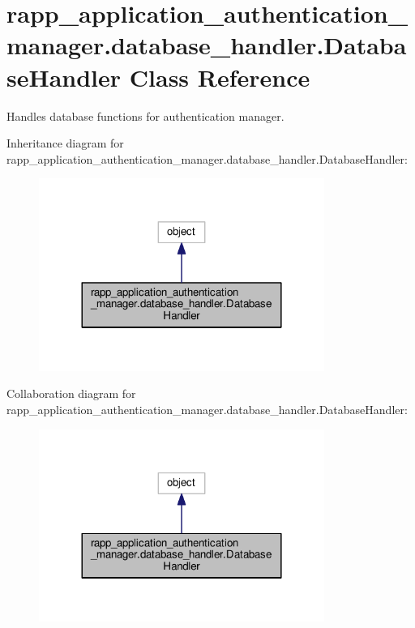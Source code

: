 \hypertarget{classrapp__application__authentication__manager_1_1database__handler_1_1DatabaseHandler}{\section{rapp\-\_\-application\-\_\-authentication\-\_\-manager.\-database\-\_\-handler.\-Database\-Handler Class Reference}
\label{classrapp__application__authentication__manager_1_1database__handler_1_1DatabaseHandler}
}


Handles database functions for authentication manager.  




Inheritance diagram for rapp\-\_\-application\-\_\-authentication\-\_\-manager.\-database\-\_\-handler.\-Database\-Handler\-:
\nopagebreak
\begin{figure}[H]
\begin{center}
\leavevmode
\includegraphics[width=264pt]{classrapp__application__authentication__manager_1_1database__handler_1_1DatabaseHandler__inherit__graph}
\end{center}
\end{figure}


Collaboration diagram for rapp\-\_\-application\-\_\-authentication\-\_\-manager.\-database\-\_\-handler.\-Database\-Handler\-:
\nopagebreak
\begin{figure}[H]
\begin{center}
\leavevmode
\includegraphics[width=264pt]{classrapp__application__authentication__manager_1_1database__handler_1_1DatabaseHandler__coll__graph}
\end{center}
\end{figure}
